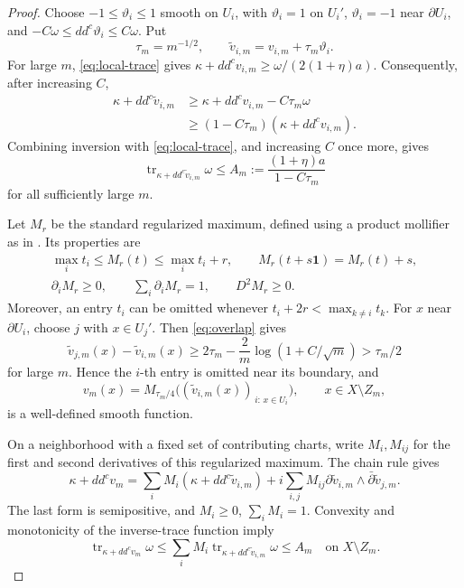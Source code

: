 \documentclass[reqno]{amsart}
\numberwithin{equation}{section}
\theoremstyle{definition}
\DeclareMathOperator{\tr}{tr}
\begin{document}
\begin{proof}
Choose $-1\le\vartheta_i\le1$ smooth on $U_i$, with
$\vartheta_i=1$ on $U_i'$, $\vartheta_i=-1$ near
$\partial U_i$, and $-C\omega\le dd^c\vartheta_i\le C\omega$.
Put
\[
\tau_m=m^{-1/2},\qquad
\widetilde v_{i,m}=v_{i,m}+\tau_m\vartheta_i.
\]
For large $m$, \eqref{eq:local-trace}
gives $\kappa+dd^cv_{i,m}\ge\omega/(2(1+\eta)a)$.
Consequently, after increasing $C$,
\[
\begin{aligned}
\kappa+dd^c\widetilde v_{i,m}
&\ge\kappa+dd^cv_{i,m}-C\tau_m\omega\\
&\ge(1-C\tau_m)(\kappa+dd^cv_{i,m}).
\end{aligned}
\]
Combining inversion with
\eqref{eq:local-trace}, and
increasing $C$ once more, gives
\begin{equation}\label{eq:perturbed-trace}
\tr_{\kappa+dd^c\widetilde v_{i,m}}\omega
\le A_m:=\frac{(1+\eta)a}{1-C\tau_m}
\end{equation}
for all sufficiently large $m$.

Let $M_r$ be the standard regularized maximum, defined using a
product mollifier as in \cite[I.5.18]{D12}. Its properties are
\[
\begin{gathered}
\max_i t_i\le M_r(t)\le\max_i t_i+r,\qquad
M_r(t+s\mathbf1)=M_r(t)+s,\\
\partial_iM_r\ge0,\qquad
\sum_i\partial_iM_r=1,\qquad D^2M_r\ge0.
\end{gathered}
\]
Moreover, an entry $t_i$ can be omitted whenever
$t_i+2r<\max_{k\ne i}t_k$.
For $x$ near $\partial U_i$, choose $j$ with $x\in U_j'$.
Then \eqref{eq:overlap} gives
\[
\widetilde v_{j,m}(x)-\widetilde v_{i,m}(x)
\ge2\tau_m-\frac2m\log(1+C/\sqrt m)>\tau_m/2
\]
for large $m$.
Hence the $i$-th entry is omitted near its boundary, and
\begin{equation}\label{eq:glued-potential}
v_m(x)=M_{\tau_m/4}
 \bigl((\widetilde v_{i,m}(x))_{\,i:\,x\in U_i}\bigr),
\qquad x\in X\setminus Z_m,
\end{equation}
is a well-defined smooth function.

On a neighborhood with a fixed set of contributing charts,
write $M_i,M_{ij}$ for the first and second derivatives of
this regularized maximum. The chain rule gives
\[
\kappa+dd^cv_m
=\sum_i M_i(\kappa+dd^c\widetilde v_{i,m})
 +i\sum_{i,j}M_{ij}
       \partial\widetilde v_{i,m}\wedge
       \bar\partial\widetilde v_{j,m}.
\]
The last form is semipositive, and $M_i\ge0$, $\sum_iM_i=1$.
Convexity and monotonicity of the inverse-trace function imply
\[
\tr_{\kappa+dd^cv_m}\omega
\le\sum_i M_i
 \tr_{\kappa+dd^c\widetilde v_{i,m}}\omega
\le A_m
\quad\text{on }X\setminus Z_m.
\]


\end{proof}
\end{document}
